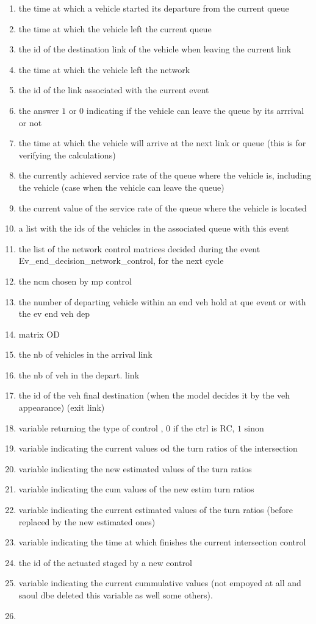 \begin{enumerate}
\item the time at which a vehicle started its departure from the current queue
\item the time at which the vehicle left the current queue
\item the id of the destination link of the vehicle when leaving the current link
\item the time at which the vehicle left the network
\item the id of the link associated with the current event
\item the answer $1$ or $0$ indicating if the vehicle can leave the queue by its arrrival or not
\item the time at which the vehicle will arrive at the next link or queue (this is for verifying the calculations)
\item the currently achieved service rate of the queue where the vehicle is, including the vehicle (case when the vehicle can leave the queue)
\item the current value of the service rate of the queue where the vehicle is located
\item a list with the ids of the vehicles in the associated queue with this event
\item the list of the network control matrices decided during the event Ev\_end\_decision\_network\_control, for the next cycle 
\item the ncm chosen by mp control 
\item the number of departing vehicle within an end veh hold at que event or with the ev end veh dep
\item matrix OD
\item the nb of vehicles in the arrival  link
\item the nb of veh in the depart. link
\item the id of the veh final destination (when the model  decides it by the veh appearance) (exit link)
\item variable returning the type of control , $0$ if the ctrl is RC, $1$ sinon
\item variable indicating the current values od the turn ratios of the intersection
\item variable indicating the new estimated values of the  turn ratios
\item variable indicating the cum values of the new estim turn ratios
\item variable indicating the current estimated values of the turn ratios (before replaced by the new estimated ones)
\item variable indicating the  time at which finishes the current intersection control
\item the id of the actuated staged  by a new control
\item variable indicating the current cummulative values (not empoyed at all and saoul dbe deleted this variable as well some others).
\item
\end{enumerate}